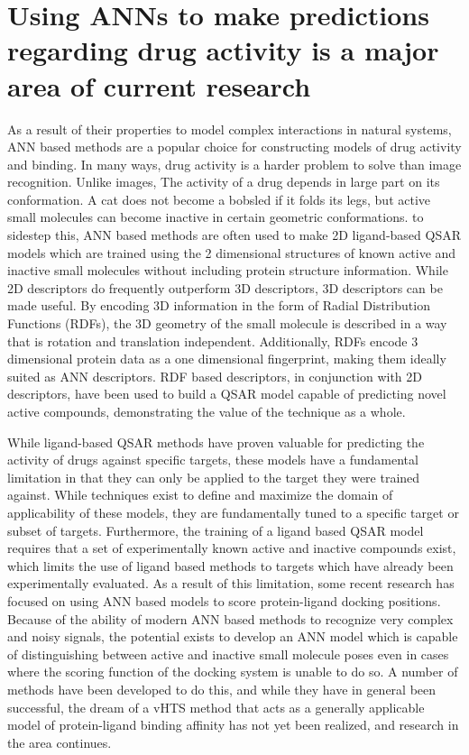 \section{Using ANNs to make predictions regarding drug activity is a major area of current research}

As a result of their properties to model complex interactions in natural systems, ANN based methods are a popular choice for constructing models of drug activity and binding. 
In many ways, drug activity is a harder problem to solve than image recognition.
Unlike images, The activity of a drug depends in large part on its conformation\citep{Nicklaus:1995tu}.
A cat does not become a bobsled if it folds its legs, but active small molecules can become inactive in certain geometric conformations.
to sidestep this, ANN based methods are often used to make 2D ligand-based QSAR models which are trained using the 2 dimensional structures of known active and inactive small molecules without including protein structure information\citep{Myint:2012ts}.
While 2D descriptors do frequently outperform 3D descriptors, 3D descriptors can be made useful.
By encoding 3D information in the form of Radial Distribution Functions (RDFs), the 3D geometry of the small molecule is described in a way that is rotation and translation independent.
Additionally, RDFs encode 3 dimensional protein data as a one dimensional fingerprint, making them ideally suited as ANN descriptors.
RDF based descriptors, in conjunction with 2D descriptors, have been used to build a QSAR model capable of predicting novel active compounds\citep{Mueller:2010dx}, demonstrating the value of the technique as a whole.

While ligand-based QSAR methods have proven valuable for predicting the activity of drugs against specific targets, these models have a fundamental limitation in that they can only be applied to the target they were trained against.
While techniques exist to define and maximize the domain of applicability of these models\citep{Sahigara:2012kb}, they are fundamentally tuned to a specific target or subset of targets. 
Furthermore, the training of a ligand based QSAR model requires that a set of experimentally known active and inactive compounds exist, which limits the use of ligand based methods to targets which have already been experimentally evaluated.
As a result of this limitation, some recent research has focused on using ANN based models to score protein-ligand docking positions.
Because of the ability of modern ANN based methods to recognize very complex and noisy signals, the potential exists to develop an ANN model which is capable of distinguishing between active and inactive small molecule poses even in cases where the scoring function of the docking system is unable to do so. 
A number of methods have been developed to do this\citep{Durrant:2013db}, and while they have in general been successful\citep{Durrant:2011dx}, the dream of a vHTS method that acts as a generally applicable model of protein-ligand binding affinity has not yet been realized, and research in the area continues. 


